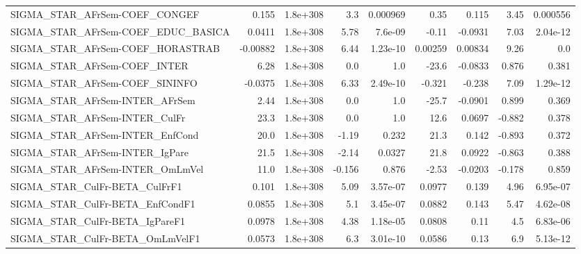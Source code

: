 \begin{tabular}{lrrrrrrrr}
SIGMA\_STAR\_AFrSem-COEF\_CONGEF         &       0.155 &     1.8e+308 &     3.3 & 0.000969 &       0.35 &       0.115 &         3.45 &      0.000556 \\
SIGMA\_STAR\_AFrSem-COEF\_EDUC\_BASICA    &      0.0411 &     1.8e+308 &    5.78 &  7.6e-09 &      -0.11 &     -0.0931 &         7.03 &      2.04e-12 \\
SIGMA\_STAR\_AFrSem-COEF\_HORASTRAB      &    -0.00882 &     1.8e+308 &    6.44 & 1.23e-10 &    0.00259 &     0.00834 &         9.26 &           0.0 \\
SIGMA\_STAR\_AFrSem-COEF\_INTER          &        6.28 &     1.8e+308 &     0.0 &      1.0 &      -23.6 &     -0.0833 &        0.876 &         0.381 \\
SIGMA\_STAR\_AFrSem-COEF\_SININFO        &     -0.0375 &     1.8e+308 &    6.33 & 2.49e-10 &     -0.321 &      -0.238 &         7.09 &      1.29e-12 \\
SIGMA\_STAR\_AFrSem-INTER\_AFrSem        &        2.44 &     1.8e+308 &     0.0 &      1.0 &      -25.7 &     -0.0901 &        0.899 &         0.369 \\
SIGMA\_STAR\_AFrSem-INTER\_CulFr         &        23.3 &     1.8e+308 &     0.0 &      1.0 &       12.6 &      0.0697 &       -0.882 &         0.378 \\
SIGMA\_STAR\_AFrSem-INTER\_EnfCond       &        20.0 &     1.8e+308 &   -1.19 &    0.232 &       21.3 &       0.142 &       -0.893 &         0.372 \\
SIGMA\_STAR\_AFrSem-INTER\_IgPare        &        21.5 &     1.8e+308 &   -2.14 &   0.0327 &       21.8 &      0.0922 &       -0.863 &         0.388 \\
SIGMA\_STAR\_AFrSem-INTER\_OmLmVel       &        11.0 &     1.8e+308 &  -0.156 &    0.876 &      -2.53 &     -0.0203 &       -0.178 &         0.859 \\
SIGMA\_STAR\_CulFr-BETA\_CulFrF1         &       0.101 &     1.8e+308 &    5.09 & 3.57e-07 &     0.0977 &       0.139 &         4.96 &      6.95e-07 \\
SIGMA\_STAR\_CulFr-BETA\_EnfCondF1       &      0.0855 &     1.8e+308 &     5.1 & 3.45e-07 &     0.0882 &       0.143 &         5.47 &      4.62e-08 \\
SIGMA\_STAR\_CulFr-BETA\_IgPareF1        &      0.0978 &     1.8e+308 &    4.38 & 1.18e-05 &     0.0808 &        0.11 &          4.5 &      6.83e-06 \\
SIGMA\_STAR\_CulFr-BETA\_OmLmVelF1       &      0.0573 &     1.8e+308 &     6.3 & 3.01e-10 &     0.0586 &        0.13 &          6.9 &      5.13e-12 \\

\end{tabular}
